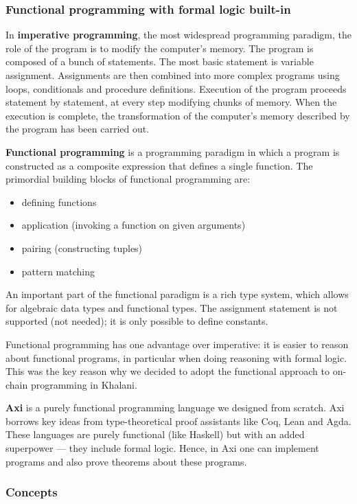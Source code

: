 \documentclass[a4paper]{article}
\begin{document}
\subsubsection{Functional programming with formal logic built-in}

In \textbf{imperative programming}, the most widespread programming paradigm, the role of the program is to modify the computer's memory. The program is composed of a bunch of statements. The most basic statement is variable assignment. Assignments are then combined into more complex programs using loops, conditionals and procedure definitions. Execution of the program proceeds statement by statement, at every step modifying chunks of memory. When the execution is complete, the transformation of the computer's memory described by the program has been carried out.

\textbf{Functional programming} is a programming paradigm in which a program is constructed as a composite expression that defines a single function. The primordial building blocks of functional programming are:

\begin{itemize}
  \item defining functions
  \item application (invoking a function on given arguments)
  \item pairing (constructing tuples)
  \item pattern matching
\end{itemize}

An important part of the functional paradigm is a rich type system, which allows for algebraic data types and functional types. The assignment statement is not supported (not needed); it is only possible to define constants.

Functional programming has one advantage over imperative: it is easier to reason about functional programs, in particular when doing reasoning with formal logic. This was the key reason why we decided to adopt the functional approach to on-chain programming in Khalani.

\textbf{Axi} is a purely functional programming language we designed from scratch. Axi borrows key ideas from type-theoretical proof assistants like Coq, Lean and Agda. These languages are purely functional (like Haskell) but with an added superpower --- they include formal logic. Hence, in Axi one can implement programs and also prove theorems about these programs.

\subsubsection{Concepts}
\end{document}
